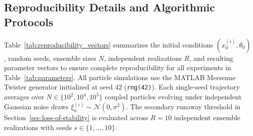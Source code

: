 \subsection{Reproducibility Details and Algorithmic Protocols}
\label{sec:reproducibility-protocols}

Table~\ref{tab:reproducibility_vectors} summarizes the initial conditions $(x_0^{(i)},\theta_0)$, random seeds, ensemble sizes $N$, independent realizations $R$, and resulting parameter vectors to ensure complete reproducibility for all experiments in Table~\ref{tab:parameters}. All particle simulations use the MATLAB Mersenne Twister generator initialized at seed $42$ (\texttt{rng(42)}). Each single-seed trajectory averages over $N \in \{10^2, 10^4, 10^5\}$ coupled particles evolving under independent Gaussian noise draws $\xi_n^{(i)} \sim \mathcal{N}(0,\sigma^2)$. The secondary runaway threshold in Section~\ref{sec:loss-of-stability} is evaluated across $R=10$ independent ensemble realizations with seeds $s \in \{1,\ldots,10\}$.


